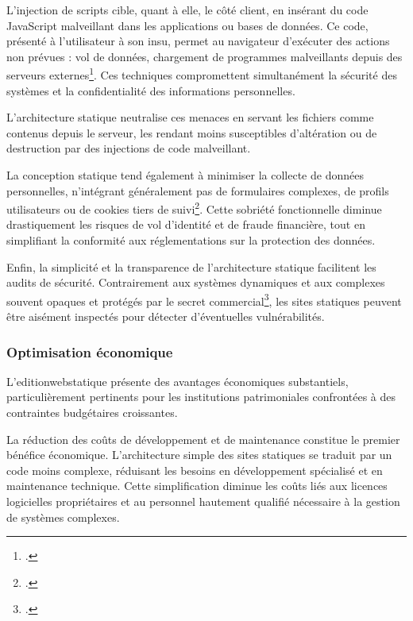 L'injection de scripts cible, quant à elle, le côté client, en insérant du code JavaScript malveillant dans les applications ou bases de données. Ce code, présenté à l'utilisateur à son insu, permet au navigateur d'exécuter des actions non prévues : vol de données, chargement de programmes malveillants depuis des serveurs externes\footcite{clarke-saltSQLInjectionAttacks2012a}. Ces techniques compromettent simultanément la sécurité des systèmes et la confidentialité des informations personnelles.

L'architecture statique neutralise ces menaces en servant les fichiers comme contenus  depuis le serveur, les rendant moins susceptibles d'altération ou de destruction par des injections de code malveillant.

La conception statique tend également à minimiser la collecte de données personnelles, n'intégrant généralement pas de formulaires complexes, de profils utilisateurs ou de cookies tiers de suivi\footcite{novaLowtechNumeriqueAux2020}. Cette sobriété fonctionnelle diminue drastiquement les risques de vol d'identité et de fraude financière, tout en simplifiant la conformité aux réglementations sur la protection des données.

Enfin, la simplicité et la transparence de l'architecture statique facilitent les audits de sécurité. Contrairement aux systèmes dynamiques et aux  complexes souvent opaques et protégés par le secret commercial\footcite{richardDansBoiteNoire2018a}, les sites statiques peuvent être aisément inspectés pour détecter d'éventuelles vulnérabilités.

\subsubsection{Optimisation économique}

L'\gls{editionwebstatique} présente des avantages économiques substantiels, particulièrement pertinents pour les institutions patrimoniales confrontées à des contraintes budgétaires croissantes.

La réduction des coûts de développement et de maintenance constitue le premier bénéfice économique. L'architecture simple des sites statiques se traduit par un code moins complexe, réduisant les besoins en développement spécialisé et en maintenance technique. Cette simplification diminue les coûts liés aux licences logicielles propriétaires et au personnel hautement qualifié nécessaire à la gestion de systèmes complexes.

